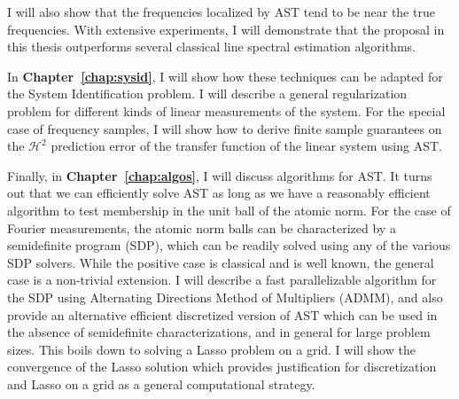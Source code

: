 I will also show that the frequencies localized by AST tend to be near the true
frequencies. With extensive experiments, I will demonstrate that the proposal in
this thesis outperforms several classical line spectral estimation algorithms.

In \textbf{Chapter~\ref{chap:sysid}}, I will show how these techniques can be
adapted for the System Identification problem. I will describe a general
regularization problem for different kinds of linear measurements of the system.
For the special case of frequency samples, I will show how to derive finite
sample guarantees on the $\mathcal{H}^2$ prediction error of the transfer
function of the linear system using AST.

Finally, in \textbf{Chapter~\ref{chap:algos}}, I will discuss algorithms for
AST. It turns out that we can efficiently solve AST as long as we have a
reasonably efficient algorithm to test membership in the unit ball of the atomic
norm. For the case of Fourier measurements, the atomic norm balls
can be characterized by a semidefinite program (SDP), which can be readily
solved using any of the various SDP solvers. While the positive case is
classical and is well known, the general case is a non-trivial extension. I
will describe a fast parallelizable algorithm for the SDP using Alternating
Directions Method of Multipliers (ADMM), and also provide an alternative
efficient discretized version of AST which can be used in the absence of
semidefinite characterizations, and in general for large problem sizes. This
boils down to solving a Lasso problem on a grid. I will show the convergence of
the Lasso solution which provides justification for discretization and Lasso on
a grid as a general computational strategy.

